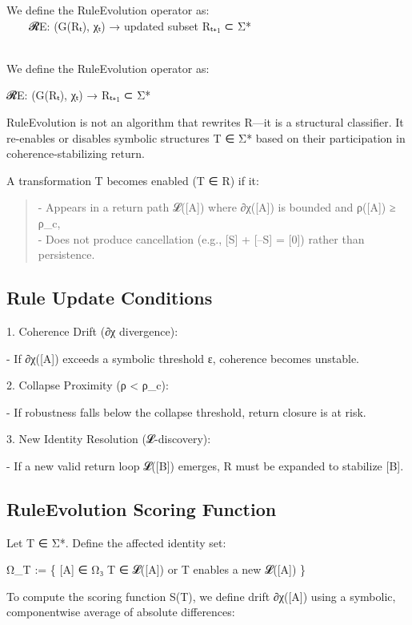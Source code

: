 We define the RuleEvolution operator as:\\
  𝓡E: (G(Rₜ), χₜ) → updated subset Rₜ₊₁ ⊂ Σ*\\
\strut \\
We define the RuleEvolution operator as:

𝓡E: (G(Rₜ), χₜ) → Rₜ₊₁ ⊂ Σ*

RuleEvolution is not an algorithm that rewrites R---it is a structural
classifier. It re-enables or disables symbolic structures T ∈ Σ* based
on their participation in coherence-stabilizing return.

A transformation T becomes enabled (T ∈ R) if it:

\begin{quote}
- Appears in a return path 𝓛({[}A{]}) where ∂χ({[}A{]}) is bounded and
ρ({[}A{]}) ≥ ρ\_c,\\
- Does not produce cancellation (e.g., {[}S{]} + {[}--S{]} = {[}0{]})
rather than persistence.
\end{quote}

\subsection{Rule Update Conditions}\label{rule-update-conditions}

1. Coherence Drift (∂χ divergence):

- If ∂χ({[}A{]}) exceeds a symbolic threshold ε, coherence becomes
unstable.

2. Collapse Proximity (ρ \textless{} ρ\_c):

- If robustness falls below the collapse threshold, return closure is at
risk.

3. New Identity Resolution (𝓛-discovery):

- If a new valid return loop 𝓛({[}B{]}) emerges, R must be expanded to
stabilize {[}B{]}.

\subsection{RuleEvolution Scoring
Function}\label{ruleevolution-scoring-function}

Let T ∈ Σ*. Define the affected identity set:

Ω\_T := \{ {[}A{]} ∈ Ω₃ \textbar{} T ∈ 𝓛({[}A{]}) or T enables a new
𝓛({[}A{]}) \}

To compute the scoring function S(T), we define drift ∂χ({[}A{]}) using
a symbolic, componentwise average of absolute differences:

